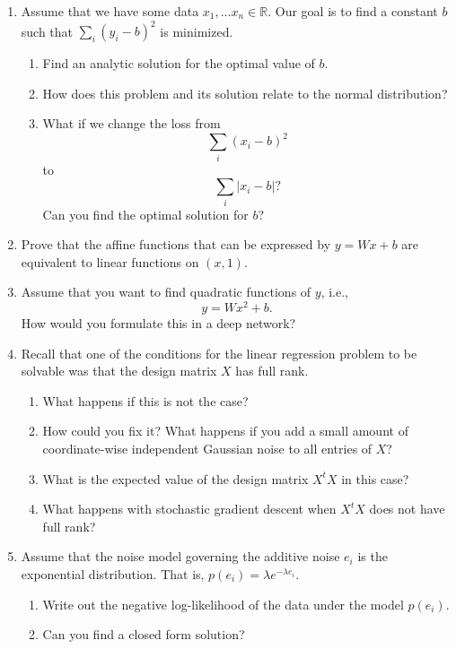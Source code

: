 \documentclass{article}
\begin{document}
\begin{enumerate}[label=\arabic*.]
\item Assume that we have some data $x_1, \dots x_n \in \mathbb{R}$. Our goal is to find a constant $b$ such that $\sum_i (y_i - b)^2$ is minimized.
	\begin{enumerate}[label=\arabic*.]
	\item Find an analytic solution for the optimal value of $b$.
	\item How does this problem and its solution relate to the normal distribution?
	\item What if we change the loss from
		\begin{equation*}
		\sum_i (x_i - b)^2
		\end{equation*}
		to
		\begin{equation*}
		\sum_i |x_i - b|?
		\end{equation*}
		Can you find the optimal solution for $b$?
	\end{enumerate}
\item Prove that the affine functions that can be expressed by $y = Wx + b$ are equivalent to linear functions on $(x, 1)$.
\item Assume that you want to find quadratic functions of $y$, i.e.,
	$$
	y = Wx^2 + b.
	$$
	How would you formulate this in a deep network?
\item Recall that one of the conditions for the linear regression problem to be solvable was that the design matrix $X$ has full rank.
	\begin{enumerate}[label=\arabic*.]
	\item What happens if this is not the case?
	\item How could you fix it? What happens if you add a small amount of coordinate-wise independent Gaussian noise to all entries of $X$?
	\item What is the expected value of the design matrix $X^tX$ in this case?
	\item What happens with stochastic gradient descent when $X^tX$ does not have full rank?
	\end{enumerate}
\item Assume that the noise model governing the additive noise $e_i$ is the exponential distribution. That is, $p(e_i) = \lambda e^{-\lambda e_i}$.
	\begin{enumerate}[label=\arabic*.]
	\item Write out the negative log-likelihood of the data under the model $p(e_i)$.
	\item Can you find a closed form solution?

\end{enumerate}
\end{enumerate}
\end{document}
